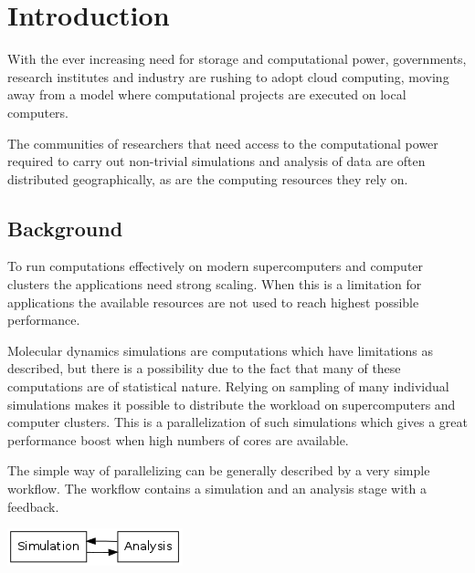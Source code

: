 \chapter{Introduction}
With the ever increasing need for storage and computational power,
governments, research institutes and industry are rushing to adopt
cloud computing, moving away from a model where computational projects
are executed on local computers.

The communities of researchers that need access to the computational
power required to carry out non-trivial simulations and analysis of
data are often distributed geographically, as are the computing
resources they rely on.



\section{Background}
To run computations effectively on modern supercomputers and computer
clusters the applications need strong scaling. When this is a
limitation for applications the available resources are not used to
reach highest possible performance.




Molecular dynamics simulations are computations which have limitations
as described, but there is a possibility due to the fact that many of
these computations are of statistical nature. Relying on sampling of
many individual simulations makes it possible to distribute the
workload on supercomputers and computer clusters. This is a
parallelization of such simulations which gives a great performance
boost when high numbers of cores are available.

The simple way of parallelizing can be generally described by a very
simple workflow. The workflow contains a simulation and an analysis
stage with a feedback. 

\begin{center}
\includegraphics{Chapters/IntroductionIncludes/workflow.png}
\end{center}

